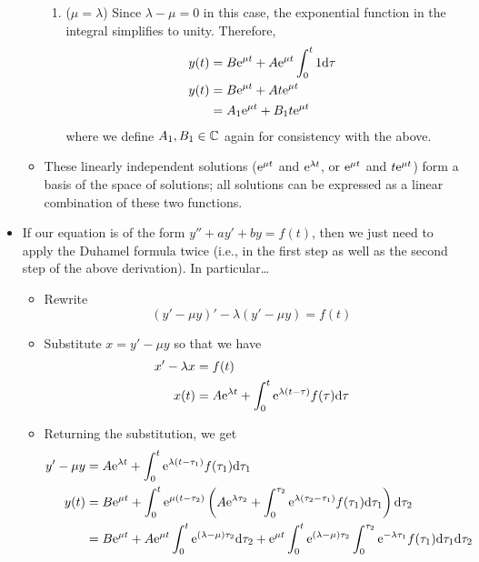 \documentclass[../notes.tex]{subfiles}
\begin{document}
\begin{itemize}
\begin{itemize}
\begin{enumerate}
            \item ($\mu=\lambda$) Since $\lambda-\mu=0$ in this case, the exponential function in the integral simplifies to unity. Therefore,
            \begin{align*}
                y(t) &= B\e[\mu t]+A\e[\mu t]\int_0^t1\dd\tau\\
                y(t) &= B\e[\mu t]+At\e[\mu t]\\
                &= A_1\e[\mu t]+B_1t\e[\mu t]
            \end{align*}
            where we define $A_1,B_1\in\C$ again for consistency with the above.
        \end{enumerate}
        \item These linearly independent solutions ($\e[\mu t]$ and $\e[\lambda t]$, or $\e[\mu t]$ and $t\e[\mu t]$) form a basis of the space of solutions; all solutions can be expressed as a linear combination of these two functions.
    \end{itemize}
    \item If our equation is of the form $y''+ay'+by=f(t)$, then we just need to apply the Duhamel formula twice (i.e., in the first step as well as the second step of the above derivation). In particular\dots
    \begin{itemize}
        \item Rewrite
        \begin{equation*}
            (y'-\mu y)'-\lambda(y'-\mu y) = f(t)
        \end{equation*}
        \item Substitute $x=y'-\mu y$ so that we have
        \begin{align*}
            x'-\lambda x &= f(t)\\
            x(t) &= A\e[\lambda t]+\int_0^t\e[\lambda(t-\tau)]f(\tau)\dd\tau
        \end{align*}
        \item Returning the substitution, we get
        \begin{align*}
            y'-\mu y &= A\e[\lambda t]+\int_0^t\e[\lambda(t-\tau_1)]f(\tau_1)\dd\tau_1\\
            y(t) &= B\e[\mu t]+\int_0^t\e[\mu(t-\tau_2)]\left( A\e[\lambda\tau_2]+\int_0^{\tau_2}\e[\lambda(\tau_2-\tau_1)]f(\tau_1)\dd\tau_1 \right)\dd\tau_2\\
            &= B\e[\mu t]+A\e[\mu t]\int_0^t\e[(\lambda-\mu)\tau_2]\dd\tau_2+\e[\mu t]\int_0^t\e[(\lambda-\mu)\tau_2]\int_0^{\tau_2}\e[-\lambda\tau_1]f(\tau_1)\dd\tau_1\dd\tau_2

\end{align*}
\end{itemize}
\end{itemize}
\end{document}
